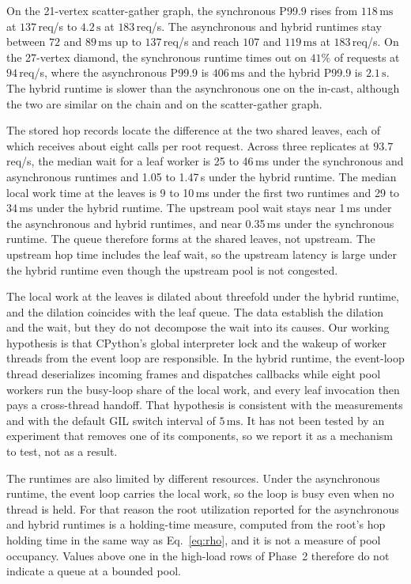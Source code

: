 On the 21-vertex scatter-gather graph, the synchronous P99.9 rises from $118\,\mathrm{ms}$ at $137$\,req/s to $4.2\,\mathrm{s}$ at $183$\,req/s. The asynchronous and hybrid runtimes stay between $72$ and $89\,\mathrm{ms}$ up to $137$\,req/s and reach $107$ and $119\,\mathrm{ms}$ at $183$\,req/s. On the 27-vertex diamond, the synchronous runtime times out on $41\%$ of requests at $94$\,req/s, where the asynchronous P99.9 is $406\,\mathrm{ms}$ and the hybrid P99.9 is $2.1\,\mathrm{s}$. The hybrid runtime is slower than the asynchronous one on the in-cast, although the two are similar on the chain and on the scatter-gather graph.



The stored hop records locate the difference at the two shared leaves, each of which receives about eight calls per root request. Across three replicates at $93.7$\,req/s, the median wait for a leaf worker is 25 to 46\,ms under the synchronous and asynchronous runtimes and 1.05 to 1.47\,s under the hybrid runtime. The median local work time at the leaves is 9 to 10\,ms under the first two runtimes and 29 to 34\,ms under the hybrid runtime. The upstream pool wait stays near 1\,ms under the asynchronous and hybrid runtimes, and near 0.35\,ms under the synchronous runtime. The queue therefore forms at the shared leaves, not upstream. The upstream hop time includes the leaf wait, so the upstream latency is large under the hybrid runtime even though the upstream pool is not congested.

The local work at the leaves is dilated about threefold under the hybrid runtime, and the dilation coincides with the leaf queue. The data establish the dilation and the wait, but they do not decompose the wait into its causes. Our working hypothesis is that CPython's global interpreter lock and the wakeup of worker threads from the event loop are responsible. In the hybrid runtime, the event-loop thread deserializes incoming frames and dispatches callbacks while eight pool workers run the busy-loop share of the local work, and every leaf invocation then pays a cross-thread handoff. That hypothesis is consistent with the measurements and with the default GIL switch interval of $5\,\mathrm{ms}$. It has not been tested by an experiment that removes one of its components, so we report it as a mechanism to test, not as a result.

The runtimes are also limited by different resources. Under the asynchronous runtime, the event loop carries the local work, so the loop is busy even when no thread is held. For that reason the root utilization reported for the asynchronous and hybrid runtimes is a holding-time measure, computed from the root's hop holding time in the same way as Eq.~\eqref{eq:rho}, and it is not a measure of pool occupancy. Values above one in the high-load rows of Phase~2 therefore do not indicate a queue at a bounded pool.

